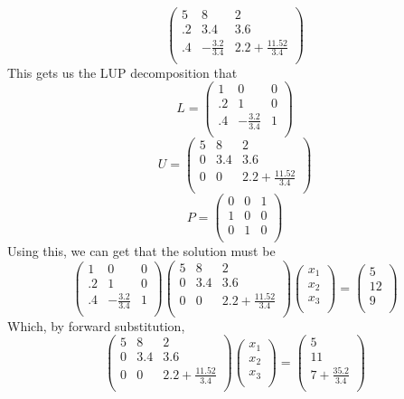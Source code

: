 \documentclass{article}
\begin{document}
 \[
 \left(\begin{array}{ccc}
 5&8&2\\
 .2&3.4&3.6\\
 .4&-\frac{3.2}{3.4}&2.2 +\frac{11.52}{3.4}\\
 \end{array}\right) 
 \]
This gets us the LUP decomposition that 
\[
L =  \left(\begin{array}{ccc}
 1&0&0\\
 .2&1&0\\
 .4&-\frac{3.2}{3.4}&1\\
 \end{array}\right) 
\]
\[
U =  \left(\begin{array}{ccc}
 5&8&2\\
 0&3.4&3.6\\
 0&0&2.2 +\frac{11.52}{3.4}\\
 \end{array}\right) 
\]
\[
P =  \left(\begin{array}{ccc}
 0&0&1\\
 1&0&0\\
 0&1&0\\
 \end{array}\right) 
\]
Using this, we can get that the solution must be
\[
\left(\begin{array}{ccc}
 1&0&0\\
 .2&1&0\\
 .4&-\frac{3.2}{3.4}&1\\
 \end{array}\right) 
 \left(\begin{array}{ccc}
 5&8&2\\
 0&3.4&3.6\\
 0&0&2.2 +\frac{11.52}{3.4}\\
 \end{array}\right) 
  \left(\begin{array}{c}
 x_1\\
 x_2\\
 x_3\\
 \end{array}\right) 
=
  \left(\begin{array}{c}
 5\\
 12\\
 9\\
 \end{array}\right) 
\]
Which, by forward substitution,
\[
 \left(\begin{array}{ccc}
 5&8&2\\
 0&3.4&3.6\\
 0&0&2.2 +\frac{11.52}{3.4}\\
 \end{array}\right) 
  \left(\begin{array}{c}
 x_1\\
 x_2\\
 x_3\\
 \end{array}\right) 
=
  \left(\begin{array}{c}
 5\\
 11\\
 7 + \frac{35.2}{3.4}\\
 \end{array}\right) 
\]
\end{document}

